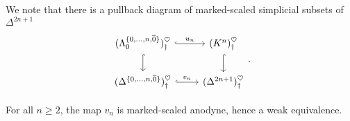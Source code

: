 \documentclass[main.tex]{subfiles}
\begin{document}
We note that there is a pullback diagram of marked-scaled simplicial subsets of $\Delta^{2n+1}$
\begin{equation}
  \label{eq:simplification_of_lifting_problem}
  \begin{tikzcd}
    (\Lambda^{\{0, \ldots, n, \overline{0}\}}_{0})^{\heartsuit}_{\dagger}
    \arrow[r, hook, "u_{n}"]
    \arrow[d, hook]
    & (K^{n})^{\heartsuit}_{\dagger}
    \arrow[d, hook]
    \\
    (\Delta^{\{0, \ldots, n, \overline{0}\}})^{\heartsuit}_{\dagger}
    \arrow[r, hook, "v_{n}"]
    & (\Delta^{2n+1})^{\heartsuit}_{\dagger}
  \end{tikzcd}.
\end{equation}

\begin{lemma}
  \label{lemma:lower_morphism_equivalence}
  For all $n \geq 2$, the map $v_{n}$ is marked-scaled anodyne, hence a weak equivalence.
\end{lemma}
\end{document}
